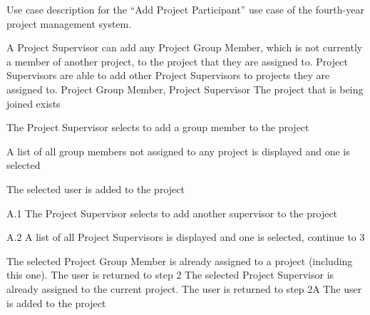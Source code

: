 \documentclass[document.tex]{subfiles}
\begin{document}
\begin{table}[!htbp]
  \centering
  \caption{Use case description for the ``Add Project Participant'' use case of the fourth-year project management system.}
  \label{tbl:use-case-join-project}

  \begin{usecase}
    A Project Supervisor can add any Project Group Member, which is not currently a member of another project, to the project that they are assigned to. Project Supervisors are able to add other Project Supervisors to projects they are assigned to.
    Project Group Member, Project Supervisor
    The project that is being joined exists
    \ucnormal
    \begin{ucenum}
      \item The Project Supervisor selects to add a group member to the project
      \item A list of all group members not assigned to any project is displayed and one is selected
      \item The selected user is added to the project
    \end{ucenum}
    \begin{ucenum}
      \item [A.1] The Project Supervisor selects to add another supervisor to the project
      \item [A.2] A list of all Project Supervisors is displayed and one is selected, continue to 3
    \end{ucenum}
    The selected Project Group Member is already assigned to a project (including this one). The user is returned to step 2
    The selected Project Supervisor is already assigned to the current project. The user is returned to step 2A
    The user is added to the project
  \end{usecase}
\end{table}
\end{document}
